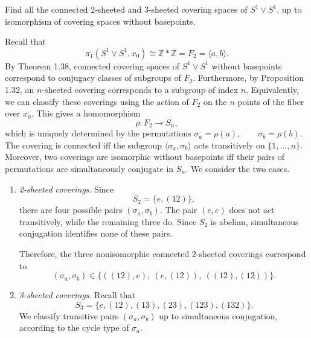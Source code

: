 	\begin{exercise}[Hatcher 1.3.10]
		Find all the connected $2$-sheeted and $3$-sheeted covering spaces of $S^1 \vee S^1$, up to isomorphism of covering spaces without basepoints.
	\end{exercise}
	\begin{solution}
		Recall that
		\begin{equation}
			\pi_1(S^1 \vee S^1, x_0)
			\cong \mathbb{Z} \ast \mathbb{Z}
			= F_2 = \langle a, b \rangle.
		\end{equation}
		By Theorem 1.38, connected covering spaces of $S^1 \vee S^1$ without basepoints correspond to conjugacy classes of subgroups of $F_2$. Furthermore, by Proposition 1.32, an $n$-sheeted covering corresponds to a subgroup of index $n$. Equivalently, we can classify these coverings using the action of $F_2$ on the $n$ points of the fiber over $x_0$. This gives a homomorphism
		\begin{equation}
			\rho: F_2 \to S_n,
		\end{equation}
		which is uniquely determined by the permutations $\sigma_a = \rho(a), \qquad \sigma_b = \rho(b)$. The covering is connected iff the subgroup $\langle \sigma_a, \sigma_b \rangle$ acts transitively on $\{1,\ldots,n\}$. Moreover, two coverings are isomorphic without basepoints iff their pairs of permutations are simultaneously conjugate in $S_n$. We consider the two cases.

		\begin{enumerate}
			\item \textit{2-sheeted coverings}.
				Since
				\begin{equation}
					S_2 = \{e, (12)\},
				\end{equation}
				there are four possible pairs $(\sigma_a,\sigma_b)$.
				The pair $(e,e)$ does not act transitively, while the
				remaining three do. Since $S_2$ is abelian, simultaneous
				conjugation identifies none of these pairs.

				Therefore, the three nonisomorphic connected
				$2$-sheeted coverings correspond to
				\begin{equation}
						(\sigma_a,\sigma_b) \in \{((12),e),\ (e,(12)),\ ((12),(12))\}.
				\end{equation}

			\item \textit{3-sheeted coverings}.
				Recall that
				\begin{equation}
					S_3 = \{e,(12),(13),(23),(123),(132)\}.
				\end{equation}
				We classify transitive pairs $(\sigma_a,\sigma_b)$
				up to simultaneous conjugation, according to the
				cycle type of $\sigma_a$.


\end{enumerate}
\end{solution}
